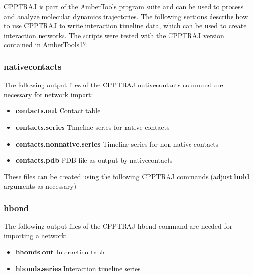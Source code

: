 CPPTRAJ \cite{CPPTRAJ} is part of the AmberTools program suite and can be used to process and analyze molecular dynamics trajectories. The following sections describe how to use CPPTRAJ to write interaction timeline data, which can be used to create interaction networks. The scripts were tested with the CPPTRAJ version contained in AmberTools17. 

\subsubsection{nativecontacts}
The following output files of the CPPTRAJ nativecontacts command are necessary for network import:

\begin{itemize}
\item \textbf{contacts.out} Contact table
\item \textbf{contacts.series} Timeline series for native contacts
\item \textbf{contacts.nonnative.series} Timeline series for non-native contacts
\item \textbf{contacts.pdb} PDB file as output by nativecontacts
\end{itemize}

These files can be created using the following CPPTRAJ commands (adjust \textbf{bold} arguments as necessary)


\subsubsection{hbond}
The following output files of the CPPTRAJ hbond command are needed for importing a network:

\begin{itemize}
\item \textbf{hbonds.out} Interaction table
\item \textbf{hbonds.series} Interaction timeline series
\end{itemize}

